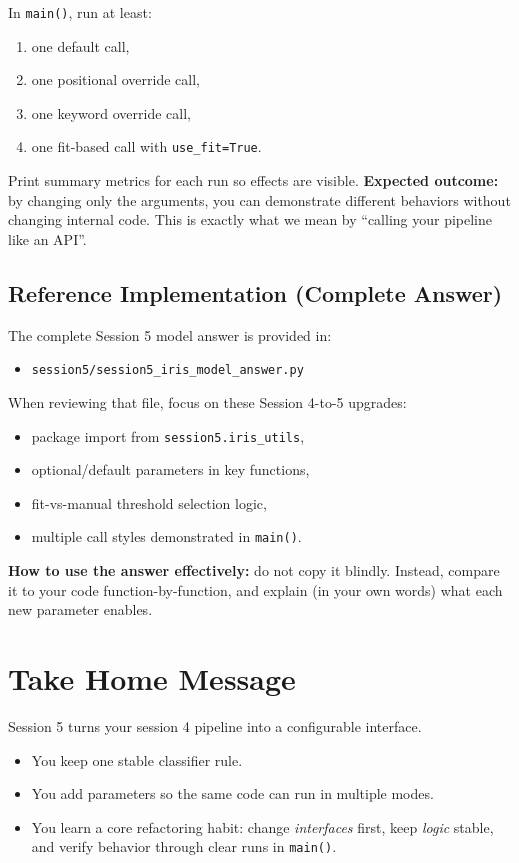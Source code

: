 \noindent
In \texttt{main()}, run at least:
\begin{enumerate}
    \item one default call,
    \item one positional override call,
    \item one keyword override call,
    \item one fit-based call with \texttt{use\_fit=True}.
\end{enumerate}

Print summary metrics for each run so effects are visible.
\noindent
\textbf{Expected outcome:} by changing only the arguments, you can demonstrate different behaviors without changing internal code.
This is exactly what we mean by ``calling your pipeline like an API''.

\subsection{Reference Implementation (Complete Answer)}
The complete Session 5 model answer is provided in:
\begin{itemize}
    \item \texttt{session5/session5\_iris\_model\_answer.py}
\end{itemize}

When reviewing that file, focus on these Session 4-to-5 upgrades:
\begin{itemize}
    \item package import from \texttt{session5.iris\_utils},
    \item optional/default parameters in key functions,
    \item fit-vs-manual threshold selection logic,
    \item multiple call styles demonstrated in \texttt{main()}.
\end{itemize}
\noindent
\textbf{How to use the answer effectively:} do not copy it blindly.
Instead, compare it to your code function-by-function, and explain (in your own words) what each new parameter enables.

\section{Take Home Message}
Session 5 turns your session 4 pipeline into a configurable interface.
\begin{itemize}\setlength{\itemsep}{2pt}
    \item You keep one stable classifier rule.
    \item You add parameters so the same code can run in multiple modes.
    \item You learn a core refactoring habit: change \textit{interfaces} first, keep \textit{logic} stable, and verify behavior through clear runs in \texttt{main()}.
\end{itemize}
